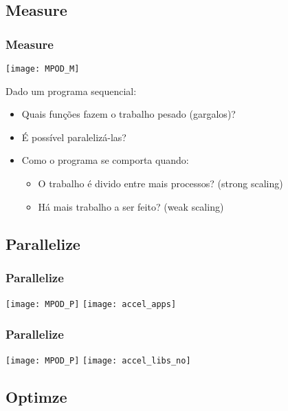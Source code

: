 \documentclass[10pt, compress]{beamer}
\begin{document}
\subsection{Measure}

\begin{frame}
    \frametitle{Measure}
    \begin{center}
    \texttt{[image: MPOD\_M]}
    \end{center}
    \vfill

    Dado um \alert{programa sequencial}:
    \begin{itemize}
        \item Quais funções fazem o \alert{trabalho pesado} (\alert{gargalos})?
        \item É possível \alert{paralelizá-las}?
        \item Como o programa se comporta quando:
            \begin{itemize}
                \item O trabalho é divido entre mais processos? (\alert{strong scaling})
                \item Há mais trabalho a ser feito? (\alert{weak scaling})
            \end{itemize}
    \end{itemize}
\end{frame}

\subsection{Parallelize}

\begin{frame}
    \frametitle{Parallelize}
    \begin{center}
    \texttt{[image: MPOD\_P]}
    \vfill
    \texttt{[image: accel\_apps]}
    \end{center}
\end{frame}

\begin{frame}
    \frametitle{Parallelize}
    \begin{center}
    \texttt{[image: MPOD\_P]}
    \vfill
    \texttt{[image: accel\_libs\_no]}
    \end{center}
\end{frame}

\subsection{Optimze}
\end{document}
